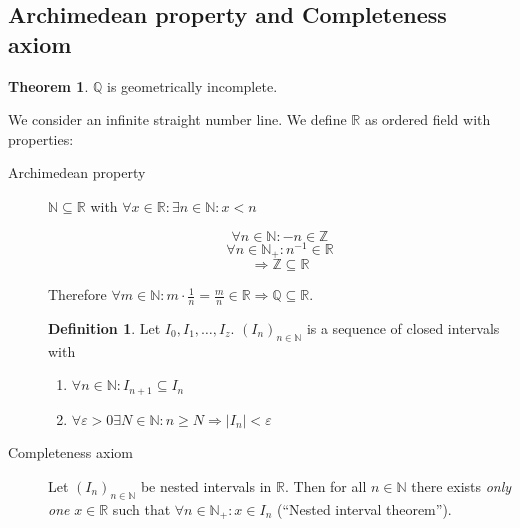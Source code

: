\documentclass[a4paper,landscape,twocolumn]{article}
\theoremstyle{definition}
\newtheorem{theorem}{Theorem}
\newtheorem{defi}{Definition}
\newcommand\abs[1]{\left|#1\right|}
\begin{document}
\subsection{Archimedean property and Completeness axiom}
\begin{theorem}
  $\mathbb Q$ is geometrically incomplete.

  We consider an infinite straight number line.
  We define $\mathbb R$ as ordered field with properties:
  \begin{description}
    \item[Archimedean property]
      $\mathbb N \subseteq \mathbb R$ with $\forall x \in \mathbb R: \exists n \in \mathbb N: x < n$

      \[ \forall n \in \mathbb N: -n \in \mathbb Z \]
      \[ \forall n \in \mathbb N_+: n^{-1} \in \mathbb R \]
      \[ \Rightarrow \mathbb Z \subseteq \mathbb R \]

      Therefore $\forall m \in \mathbb N: m \cdot \frac1n = \frac mn \in \mathbb R
      \Rightarrow \mathbb Q \subseteq \mathbb R$.

      \begin{defi}
        Let $I_0, I_1, \dots, I_z$. $(I_n)_{n \in \mathbb N}$ is a sequence of closed intervals with
        \begin{enumerate}
          \item $\forall n \in \mathbb N: I_{n+1} \subseteq I_n$
          \item $\forall \varepsilon > 0 \exists N \in \mathbb N: n \geq N \Rightarrow \abs{I_n} < \varepsilon$
        \end{enumerate}
      \end{defi}

    \item[Completeness axiom]
      Let $(I_n)_{n \in \mathbb N}$ be nested intervals in $\mathbb R$.
      Then for all $n \in \mathbb N$ there exists \emph{only one} $x \in \mathbb R$ such that $\forall n \in \mathbb N_+: x \in I_n$
      (\enquote{Nested interval theorem}).


\end{description}
\end{theorem}
\end{document}
